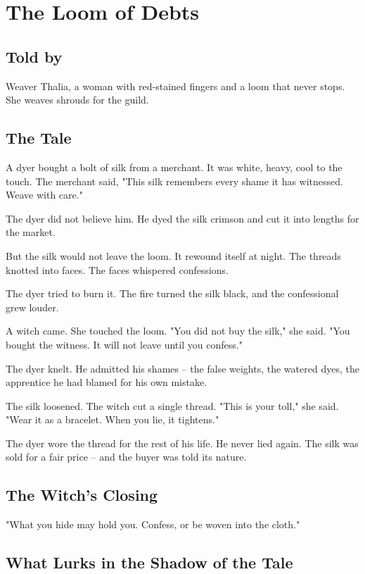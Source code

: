 \chapter{The Loom of Debts}

\section*{Told by}
Weaver Thalia, a woman with red‑stained fingers and a loom that never stops. She weaves shrouds for the guild.

\section*{The Tale}

A dyer bought a bolt of silk from a merchant. It was white, heavy, cool to the touch. The merchant said, "This silk remembers every shame it has witnessed. Weave with care."

The dyer did not believe him. He dyed the silk crimson and cut it into lengths for the market.

But the silk would not leave the loom. It rewound itself at night. The threads knotted into faces. The faces whispered confessions.

The dyer tried to burn it. The fire turned the silk black, and the confessional grew louder.

A witch came. She touched the loom. "You did not buy the silk," she said. "You bought the witness. It will not leave until you confess."

The dyer knelt. He admitted his shames -- the false weights, the watered dyes, the apprentice he had blamed for his own mistake.

The silk loosened. The witch cut a single thread. "This is your toll," she said. "Wear it as a bracelet. When you lie, it tightens."

The dyer wore the thread for the rest of his life. He never lied again. The silk was sold for a fair price -- and the buyer was told its nature.

\section*{The Witch's Closing}
"What you hide may hold you. Confess, or be woven into the cloth."

\section*{What Lurks in the Shadow of the Tale}

